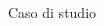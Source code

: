 \begin{frame}{Caso di studio}
\begin{columns}[onlytextwidth]
\begin{column}{0.45\textwidth}
\begin{figure}[H]
            \end{figure}
        \end{column}
    \end{columns}
\end{frame}